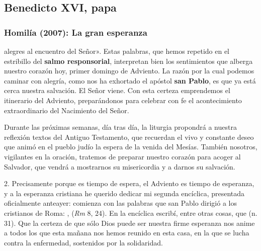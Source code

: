 \newsection

\subsection{Benedicto XVI, papa}

\subsubsection{Homilía (2007): La gran esperanza}


\begin{body}
	 alegres al encuentro del Señor». Estas palabras, que hemos repetido en el estribillo del \textbf{salmo responsorial}, interpretan bien los sentimientos que alberga nuestro corazón hoy, primer domingo de Adviento. La razón por la cual podemos caminar con alegría, como nos ha exhortado el apóstol \textbf{san Pablo}, es que ya está cerca nuestra salvación. El Señor viene. Con esta certeza emprendemos el itinerario del Adviento, preparándonos para celebrar con fe el acontecimiento extraordinario del Nacimiento del Señor. 
	
	Durante las próximas semanas, día tras día, la liturgia propondrá a nuestra reflexión textos del Antiguo Testamento, que recuerdan el vivo y constante deseo que animó en el pueblo judío la espera de la venida del Mesías. También nosotros, vigilantes en la oración, tratemos de preparar nuestro corazón para acoger al Salvador, que vendrá a mostrarnos su misericordia y a darnos su salvación. 
	
	2. Precisamente porque es tiempo de espera, el Adviento es tiempo de esperanza, y a la esperanza cristiana he querido dedicar mi segunda encíclica, presentada oficialmente anteayer: comienza con las palabras que san Pablo dirigió a los cristianos de Roma: \emph{},  (\emph{Rm} 8, 24). En la encíclica escribí, entre otras cosas, que  (n. 31). Que la certeza de que sólo Dios puede ser nuestra firme esperanza nos anime a todos los que esta mañana nos hemos reunido en esta casa, en la que se lucha contra la enfermedad, sostenidos por la solidaridad. 
	

\end{body}
